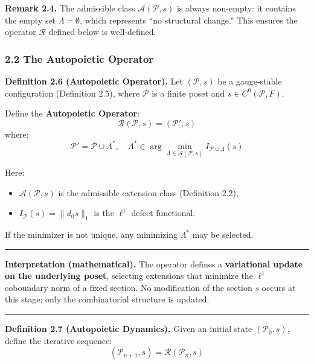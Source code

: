 \documentclass[
]{article}
\providecommand{\tightlist}{%
  \setlength{\itemsep}{0pt}\setlength{\parskip}{0pt}}
\begin{document}
\textbf{Remark 2.4.} The admissible class
\(\mathcal{A}(\mathcal{P}, s)\) is always non-empty: it contains the
empty set \(\Lambda = \emptyset\), which represents ``no structural
change.'' This ensures the operator \(\mathcal{R}\) defined below is
well-defined.

\subsubsection{2.2 The Autopoietic
Operator}\label{the-autopoietic-operator}

\textbf{Definition 2.6 (Autopoietic Operator).} Let \((\mathcal{P}, s)\)
be a gauge-stable configuration (Definition 2.5), where \(\mathcal{P}\)
is a finite poset and \(s \in C^0(\mathcal{P}, F)\).

Define the \textbf{Autopoietic Operator}:
\[ \mathcal{R}(\mathcal{P}, s) = (\mathcal{P}', s) \] where:
\[ \mathcal{P}' = \mathcal{P} \cup \Lambda^*, \quad \Lambda^* \in \arg\min_{\Lambda \in \mathcal{A}(\mathcal{P}, s)} I_{\mathcal{P} \cup \Lambda}(s) \]

Here:

\begin{itemize}
\tightlist
\item
  \(\mathcal{A}(\mathcal{P}, s)\) is the admissible extension class
  (Definition 2.2),
\item
  \(I_{\mathcal{P}}(s) = \|d_0 s\|_1\) is the \(\ell^1\) defect
  functional.
\end{itemize}

If the minimizer is not unique, any minimizing \(\Lambda^*\) may be
selected.

\begin{center}\rule{0.5\linewidth}{0.5pt}\end{center}

\textbf{Interpretation (mathematical).} The operator defines a
\textbf{variational update on the underlying poset}, selecting
extensions that minimize the \(\ell^1\) coboundary norm of a fixed
section. No modification of the section \(s\) occurs at this stage; only
the combinatorial structure is updated.

\begin{center}\rule{0.5\linewidth}{0.5pt}\end{center}

\textbf{Definition 2.7 (Autopoietic Dynamics).} Given an initial state
\((\mathcal{P}_0, s)\), define the iterative sequence:
\[ (\mathcal{P}_{n+1}, s) = \mathcal{R}(\mathcal{P}_n, s) \]
\end{document}
